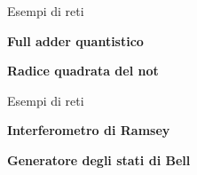 \documentclass[aspectratio=169]{beamer}
\begin{document}
%
\begin{frame}{Esempi di reti}
	\begin{minipage}{0.6\textwidth}
		\centering
		\textbf{Full adder quantistico}
	\end{minipage}
	\pause
	\vspace{-20pt}
	\begin{flushright}
		\begin{minipage}{0.6\textwidth}
			\centering
			\textbf{Radice quadrata del not}\\
		\end{minipage}
	\end{flushright}
\end{frame}
\begin{frame}{Esempi di reti}
	\begin{minipage}{0.60\textwidth}
		\centering
		\textbf{Interferometro di Ramsey}
		\scalebox{2}{
			\begin{quantikz}
				\qw & \gate{H} & \gate{P}	& \gate{H} & \qw
			\end{quantikz}
		}
	\end{minipage}
	\pause
	\begin{flushright}
		\begin{minipage}{0.5\textwidth}
			\centering
			\textbf{Generatore degli stati di Bell}
			\scalebox{2}{
				\begin{quantikz}
					\qw & \gate{H} & \ctrl{1}	& \qw \\
					\qw &    \qw   & \targ{} &  \qw
				\end{quantikz}
			}
		\end{minipage}
	\end{flushright}


\end{frame}
\end{document}
